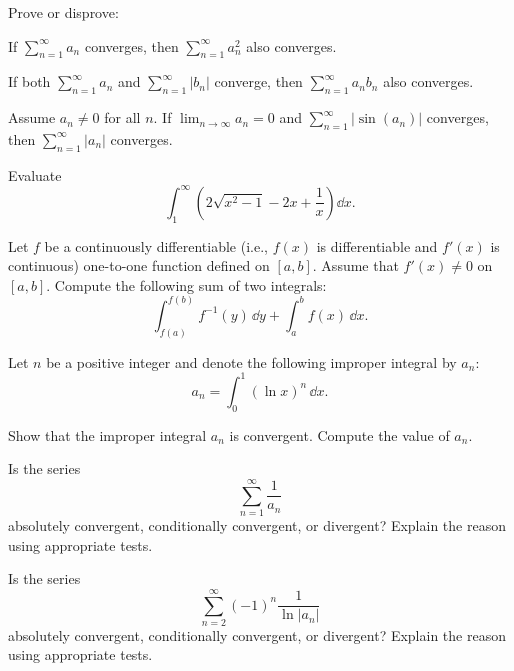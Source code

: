 \begin{problem}
Prove or disprove:
\begin{problemchoices}
\item If $\displaystyle\sum_{n=1}^{\infty}a_n$ converges, then $\displaystyle\sum_{n=1}^{\infty}a_n^2$ also converges.
\item If both $\displaystyle\sum_{n=1}^{\infty}a_n$ and $\displaystyle\sum_{n=1}^{\infty}|b_n|$ converge, then $\displaystyle\sum_{n=1}^{\infty}a_nb_n$ also converges.
\item Assume $a_n\ne0$ for all $n$. If $\displaystyle\lim_{n\to\infty}a_n=0$ and $\displaystyle\sum_{n=1}^{\infty}|\sin(a_n)|$ converges, then $\displaystyle\sum_{n=1}^{\infty}|a_n|$ converges.
\end{problemchoices}
\end{problem}

\begin{problem}
Evaluate
\[
\int_1^\infty\left(2\sqrt{x^2-1}-2x+\frac1x\right)\dd x.
\]
\end{problem}

\begin{problem}
Let $f$ be a continuously differentiable (i.e., $f(x)$ is differentiable and $f'(x)$ is continuous) one-to-one function defined on $[a,b]$. Assume that $f'(x)\ne0$ on $[a,b]$. Compute the following sum of two integrals:
\[
\int_{f(a)}^{f(b)}f^{-1}(y)\,\dd y+\int_a^b f(x)\,\dd x.
\]
\end{problem}

\begin{problem}
Let $n$ be a positive integer and denote the following improper integral by $a_n$:
\[
a_n=\int_0^1(\ln x)^n\,\dd x.
\]
\begin{problemsubparts}
\item Show that the improper integral $a_n$ is convergent. Compute the value of $a_n$.
\item Is the series
\[
\sum_{n=1}^{\infty}\frac1{a_n}
\]
absolutely convergent, conditionally convergent, or divergent? Explain the reason using appropriate tests.
\item Is the series
\[
\sum_{n=2}^{\infty}(-1)^n\frac1{\ln|a_n|}
\]
absolutely convergent, conditionally convergent, or divergent? Explain the reason using appropriate tests.
\end{problemsubparts}
\end{problem}

